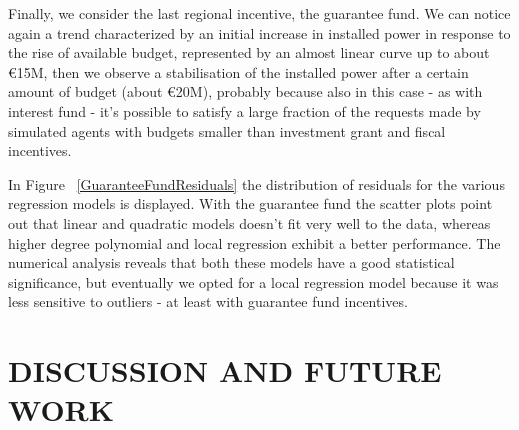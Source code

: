 \documentclass [twocolumn,a4paper,10pt]{ECMS}
\newcommand{\Section}[1]{\section*{#1}\vspace*{-0.7em}}
\begin{document}
Finally, we consider the last regional incentive, the guarantee fund. We can notice again a trend characterized by an initial increase in installed power in response to the rise of available budget, represented by an almost linear curve up to about \euro15M,	then we observe a stabilisation of the installed power after a certain amount of budget (about \euro20M), probably because also in this case - as with interest fund - it's possible to satisfy a large fraction of the requests made by simulated agents with budgets smaller than investment grant and fiscal incentives.

In Figure ~\ref{GuaranteeFundResiduals} the distribution of residuals for the various regression models is displayed. With the guarantee fund the scatter plots point out that linear and quadratic models doesn't fit very well to the data, whereas higher degree polynomial and local regression exhibit a better performance. The numerical analysis reveals that both these models have a good statistical significance, but eventually we opted for a local regression model because it was less sensitive to outliers - at least with guarantee fund incentives.  



\Section{DISCUSSION AND FUTURE WORK}



%
%
%
%
%
%

\end{document}
